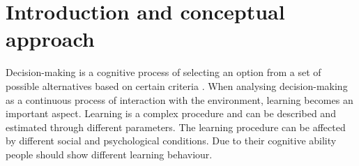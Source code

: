\documentclass[12pt,a4paper,bibliography=totocnumbered,listof=totocnumbered]{scrartcl}
\begin{document}
\newpage





\renewcommand{\sectionmark}[1]{\markright{#1}}
\renewcommand{\subsectionmark}[1]{}
\renewcommand{\subsubsectionmark}[1]{}
\rhead{\rightmark}

\onehalfspacing

\renewcommand{\thesection}{\arabic{section}}
\renewcommand{\theHsection}{\arabic{section}}
\setcounter{section}{0}
\setcounter{page}{1}




\section{Introduction and conceptual approach}

Decision-making is a cognitive process of selecting an option from a set of possible alternatives based on certain criteria \cite{Wang2007}. When analysing decision-making as a continuous process of interaction with the environment, learning becomes an important aspect. Learning is a complex procedure and can be described and estimated through different parameters. The learning procedure can be affected by different social and psychological conditions. Due to their cognitive ability people should show different learning behaviour.\\
\end{document}
